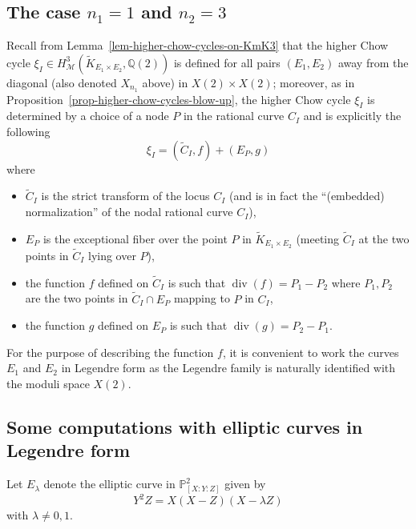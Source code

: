 \documentclass[11pt,a4paper]{article}
\DeclareMathOperator{\divsr}{div}
\begin{document}
\subsection{The case $n_1 = 1$ and $n_2 = 3$} Recall from Lemma~\ref{lem-higher-chow-cycles-on-KmK3} that the higher Chow cycle $\xi_I \in H^3_{\mathcal{M}}(\widetilde{K}_{E_1 \times E_2}, \mathbb{Q}(2))$ is defined for all pairs $(E_1, E_2)$ away from the diagonal (also denoted $X_{n_1}$ above) in $X(2) \times X(2)$; moreover, as in Proposition~\ref{prop-higher-chow-cycles-blow-up}, the higher Chow cycle $\xi_{I}$ is determined by a choice of a node $P$ in the rational curve $C_I$ and is explicitly the following
\[\xi_I = (\widetilde{C}_I, f) + (E_P, g)\]
where
\begin{itemize}
\item $\widetilde{C}_I$ is the strict transform of the locus $C_I$ (and is in fact the ``(embedded) normalization'' of the nodal rational curve $C_I$), 
\item $E_P$ is the exceptional fiber over the point $P$ in $\widetilde{K}_{E_1 \times E_2}$ (meeting $\widetilde{C}_I$ at the two points in $\widetilde{C}_I$ lying over $P$),
\item the function $f$ defined on $\widetilde{C}_I$ is such that $\divsr(f)= P_1 - P_2$ where $P_1, P_2$ are the two points in $\widetilde{C}_I \cap E_P$ mapping to $P$ in $C_I$,
\item the function $g$ defined on $E_P$ is such that $\divsr(g) = P_2 - P_1$.
\end{itemize}
For the purpose of describing the function $f$, it is convenient to work the curves $E_1$ and $E_2$ in Legendre form as the Legendre family is naturally identified with the moduli space $X(2)$. 

\subsection{Some computations with elliptic curves in Legendre form} Let $E_\lambda$ denote the elliptic curve in $\mathbb{P}^2_{[X:Y:Z]}$ given by
\begin{equation}
Y^2Z = X(X-Z)(X-\lambda Z) 
\end{equation} 
with $\lambda \neq 0, 1$.
\end{document}
